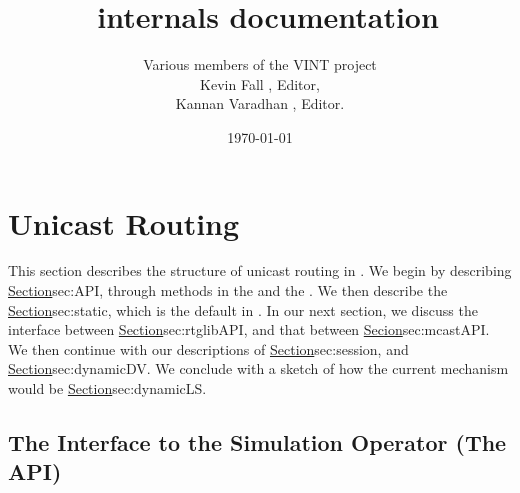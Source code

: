 \documentclass{article}
\begin{document}
\title{\ns\ internals documentation}
\author{%
  Various members of the VINT project \\
  Kevin Fall , Editor,\\
  Kannan Varadhan , Editor.}
\date{\today}

\section{Unicast Routing}
\label{sec:unicast}

This section describes the structure of unicast routing in \ns.
We begin by describing
\href{the interface to the user}{Section}{sec:API},
through methods in the 
and the .
We then describe the
\href{static routing}{Section}{sec:static}, which is the default in \ns.
In our next section, we discuss the interface between 
\href{unicast routing and network dynamics}{Section}{sec:rtglibAPI},
and that between
\href{unicast routing and multicast routing}{Secion}{sec:mcastAPI}.
We then continue with our descriptions of
\href{session routing}{Section}{sec:session}, and
\href{dynamic DV routing}{Section}{sec:dynamicDV}.
We conclude with a sketch of how the current mechanism would be
\href{adapted for dynamic LS routing}{Section}{sec:dynamicLS}.

\subsection{The Interface to the Simulation Operator (The API)}
\label{sec:API}
\end{document}
